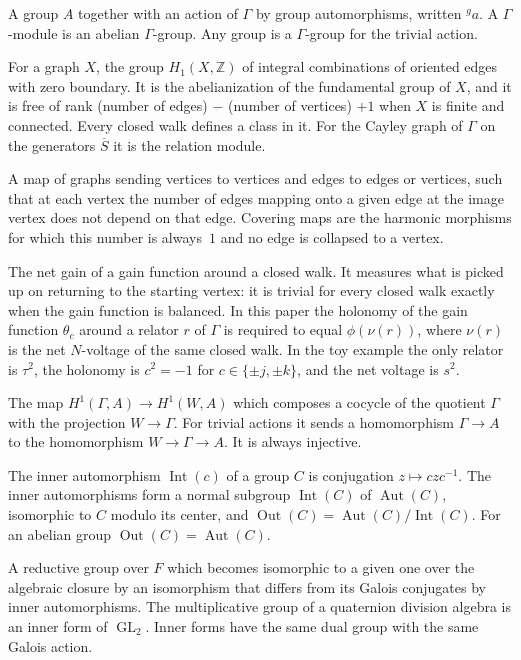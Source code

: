 \documentclass[12pt,letterpaper]{article}
\numberwithin{equation}{section}
\theoremstyle{plain}
\theoremstyle{definition}
\newcommand{\Z}{\mathbb{Z}}
\newcommand{\act}[2]{{}^{#1}\!#2}          %
\DeclareMathOperator{\Aut}{Aut}
\DeclareMathOperator{\Int}{Int}
\DeclareMathOperator{\Out}{Out}
\DeclareMathOperator{\GL}{GL}
\begin{document}
\begin{description}[itemsep=3pt,leftmargin=1.5em,style=unboxed]
\item[$\Gamma$-group.] A group $A$ together with an action of $\Gamma$ by
group automorphisms, written $\act{g}{a}$. A $\Gamma$-module is an abelian
$\Gamma$-group. Any group is a $\Gamma$-group for the trivial action.

\item[Graph homology.] For a graph $X$, the group $H_1(X,\Z)$ of integral
combinations of oriented edges with zero boundary. It is the
abelianization of the fundamental group of $X$, and it is free of rank
(number of edges) $-$ (number of vertices) $+1$ when $X$ is finite and
connected. Every closed walk defines a class in it. For the Cayley graph
of $\Gamma$ on the generators $\overline{S}$ it is the relation module.

\item[Harmonic morphism.] A map of graphs sending vertices to vertices and
edges to edges or vertices, such that at each vertex the number of edges
mapping onto a given edge at the image vertex does not depend on that
edge. Covering maps are the harmonic morphisms for which this number is
always~$1$ and no edge is collapsed to a vertex.

\item[Holonomy.] The net gain of a gain function around a closed walk. It
measures what is picked up on returning to the starting vertex: it is
trivial for every closed walk exactly when the gain function is balanced.
In this paper the holonomy of the gain function $\theta_c$ around a relator
$r$ of $\Gamma$ is required to equal $\phi(\nu(r))$, where $\nu(r)$ is the
net $N$-voltage of the same closed walk. In the toy example the only
relator is $\tau^2$, the holonomy is $c^2=-1$ for $c\in\{\pm j,\pm k\}$,
and the net voltage is $s^2$.

\item[Inflation.] The map $H^1(\Gamma,A)\to H^1(W,A)$ which composes a
cocycle of the quotient $\Gamma$ with the projection $W\to\Gamma$. For
trivial actions it sends a homomorphism $\Gamma\to A$ to the homomorphism
$W\to\Gamma\to A$. It is always injective.

\item[Inner automorphism and outer automorphism group.] The inner
automorphism $\Int(c)$ of a group $C$ is conjugation $z\mapsto czc^{-1}$.
The inner automorphisms form a normal subgroup $\Int(C)$ of $\Aut(C)$,
isomorphic to $C$ modulo its center, and $\Out(C)=\Aut(C)/\Int(C)$. For an
abelian group $\Out(C)=\Aut(C)$.

\item[Inner form.] A reductive group over $F$ which becomes isomorphic to
a given one over the algebraic closure by an isomorphism that differs from
its Galois conjugates by inner automorphisms. The multiplicative group of
a quaternion division algebra is an inner form of $\GL_2$. Inner forms
have the same dual group with the same Galois action.


\end{description}
\end{document}
